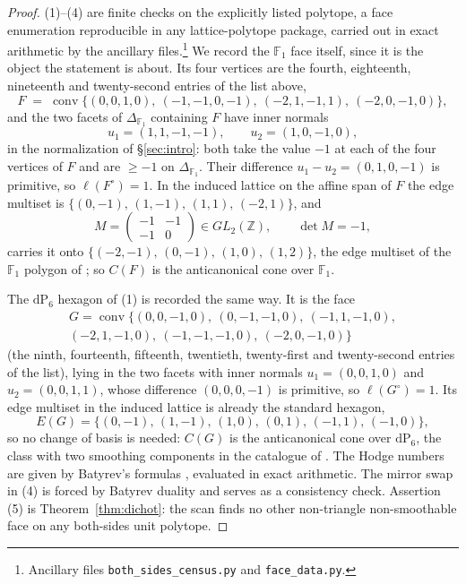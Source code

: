 \documentclass[11pt]{amsart}
\theoremstyle{definition}
\theoremstyle{remark}
\newcommand{\ZZ}{\mathbb{Z}}
\newcommand{\FF}{\mathbb{F}}
\newcommand{\conv}{\operatorname{conv}}
\begin{document}
\begin{proof}
(1)--(4) are finite checks on the explicitly listed polytope, a face
enumeration reproducible in any lattice-polytope package, carried out
in exact arithmetic by the ancillary files.\footnote{Ancillary files
\texttt{both\_sides\_census.py} and \texttt{face\_data.py}.}  We record
the $\FF_1$ face itself, since it is the object the statement is about.  Its
four vertices are the fourth, eighteenth, nineteenth and twenty-second entries
of the list above,
\[
F \;=\; \conv\bigl\{(0,0,1,0),\ (-1,-1,0,-1),\ (-2,1,-1,1),\
(-2,0,-1,0)\bigr\},
\]
and the two facets of $\Delta_{\FF_1}$ containing $F$ have inner normals
\[
u_1 = (1,1,-1,-1), \qquad u_2 = (1,0,-1,0),
\]
in the normalization of \S\ref{sec:intro}: both take the value $-1$ at each
of the four vertices of $F$ and are $\ge -1$ on $\Delta_{\FF_1}$.  Their
difference $u_1 - u_2 = (0,1,0,-1)$ is primitive, so
$\ell(F^\circ) = 1$.  In the induced lattice on the affine span of $F$ the
edge multiset is
$\{(0,-1),\,(1,-1),\,(1,1),\,(-2,1)\}$, and
\[
M=\begin{pmatrix}-1&-1\\-1&0\end{pmatrix} \in GL_2(\ZZ),
\qquad \det M = -1,
\]
carries it onto $\{(-2,-1),\,(0,-1),\,(1,0),\,(1,2)\}$, the edge
multiset of the $\FF_1$ polygon of \cite[Rem.~2.6]{paper1}; so $C(F)$ is the
anticanonical cone over $\FF_1$.

The $\mathrm{dP}_6$ hexagon of (1) is recorded the same way.  It is the face
\[
\begin{gathered}
G = \conv\bigl\{(0,0,-1,0),\ (0,-1,-1,0),\ (-1,1,-1,0),\\
(-2,1,-1,0),\ (-1,-1,-1,0),\ (-2,0,-1,0)\bigr\}
\end{gathered}
\]
(the ninth, fourteenth, fifteenth, twentieth, twenty-first and
twenty-second entries of the list), lying in the two facets with inner
normals $u_1 = (0,0,1,0)$ and $u_2 = (0,0,1,1)$, whose difference
$(0,0,0,-1)$ is primitive, so $\ell(G^\circ) = 1$.  Its edge multiset in the
induced lattice is already the standard hexagon,
\[
E(G) = \{(0,-1),\,(1,-1),\,(1,0),\,(0,1),\,(-1,1),\,(-1,0)\},
\]
so no change of basis is needed: $C(G)$ is the anticanonical cone over
$\mathrm{dP}_6$, the class with two smoothing components in the catalogue of
\cite[Rem.~2.6]{paper1}.  The Hodge numbers are
given by Batyrev's formulas \cite[\S4]{Batyrev94}, evaluated in exact
arithmetic.  The mirror swap in (4) is forced by Batyrev duality and serves as
a consistency check.  Assertion (5) is
Theorem~\ref{thm:dichot}: the scan finds no other non-triangle
non-smoothable face on any both-sides unit polytope.
\end{proof}
\end{document}
